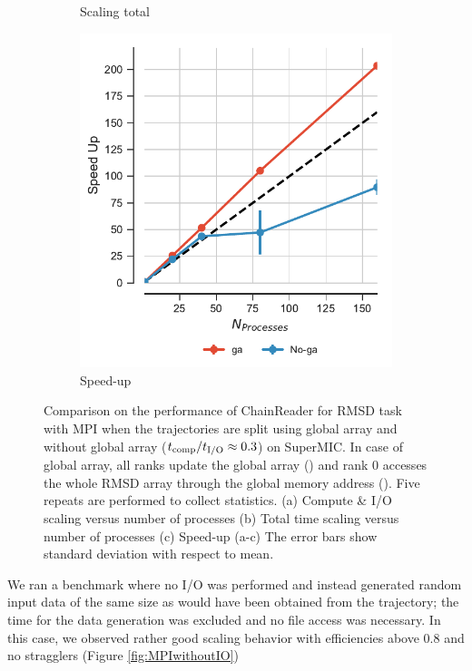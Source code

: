 \begin{figure}[ht!]
\begin{subfigure}{.3\textwidth}
  \caption{Scaling total}
  \label{fig:MPItottime-chain-reader}
\end{subfigure}
\hfill
\begin{subfigure}{.3\textwidth}
  \includegraphics[width=\linewidth]{figures/Comparison_Speed_UP_traj_splitting-SuperMIC.pdf}
  \caption{Speed-up}
  \label{fig:MPIspeedup-chain-reader}
\end{subfigure}

\caption{Comparison on the performance of ChainReader for RMSD task with MPI when the trajectories are split using global array and without global array (${t}_{\text{comp}}/{t}_{\text{I/O}} \approx 0.3$) on SuperMIC.
In case of global array, all ranks update the global array () and rank 0 accesses the whole RMSD array through the global memory address ().
Five repeats are performed to collect statistics. (a) Compute \& I/O scaling versus number of processes (b) Total time scaling versus number of processes (c) Speed-up (a-c) The error bars show standard deviation with respect to mean.}
\label{fig:MPIwithIO-split-SuperMIC}
\end{figure}


We ran a benchmark where no I/O was performed and instead generated random input data of the same size as would have been obtained from the trajectory; the time for the data generation was excluded and no file access was necessary. 
In this case, we observed rather good scaling behavior with efficiencies above 0.8 and no stragglers (Figure \ref{fig:MPIwithoutIO})

